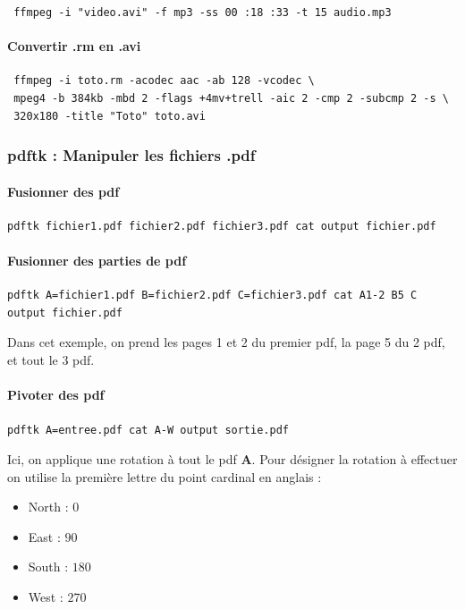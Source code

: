 \documentclass[a4paper,twoside]{article}
\begin{document}
\verb| ffmpeg -i "video.avi" -f mp3 -ss 00 :18 :33 -t 15 audio.mp3|
\paragraph{Convertir .rm en .avi}
\begin{verbatim}
 ffmpeg -i toto.rm -acodec aac -ab 128 -vcodec \
 mpeg4 -b 384kb -mbd 2 -flags +4mv+trell -aic 2 -cmp 2 -subcmp 2 -s \
 320x180 -title "Toto" toto.avi
\end{verbatim}

\subsubsection{pdftk : Manipuler les fichiers .pdf}
\paragraph{Fusionner des pdf}
\begin{verbatim}
pdftk fichier1.pdf fichier2.pdf fichier3.pdf cat output fichier.pdf
\end{verbatim}

\paragraph{Fusionner des parties de pdf}
\begin{verbatim}
pdftk A=fichier1.pdf B=fichier2.pdf C=fichier3.pdf cat A1-2 B5 C output fichier.pdf
\end{verbatim}

Dans cet exemple, on prend les pages 1 et 2 du premier pdf, la page 5 du 2\ieme{} pdf, et tout le 3\ieme{} pdf.

\paragraph{Pivoter des pdf}
\verb|pdftk A=entree.pdf cat A-W output sortie.pdf|

Ici, on applique une rotation à tout le pdf \textbf{A}. Pour désigner la rotation à effectuer on utilise la première lettre du point cardinal en anglais :

\begin{itemize}
 \item North : $0$\degre
\item East : $90$\degre
\item South : $180$\degre
\item West : $270$\degre
\end{itemize}
\end{document}
